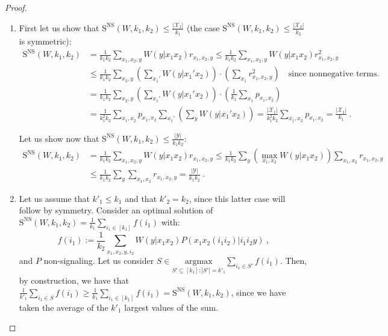 \documentclass[11pt]{article}
\theoremstyle{definition}
\theoremstyle{remark}
\begin{document}
\begin{proof}
\begin{enumerate}
  \item First let us show that $\mathrm{S}^{\mathrm{NS}}(W,k_1,k_2) \leq \frac{|\mathcal{X}_1|}{k_1}$ (the case $\mathrm{S}^{\mathrm{NS}}(W,k_1,k_2) \leq \frac{|\mathcal{X}_2|}{k_2}$ is symmetric):
    \begin{equation}
      \begin{aligned}
        \mathrm{S}^{\mathrm{NS}}(W,k_1,k_2) &= \frac{1}{k_1k_2} \sum_{x_1,x_2,y} W(y|x_1x_2)r_{x_1,x_2,y} \leq \frac{1}{k_1k_2} \sum_{x_1,x_2,y} W(y|x_1x_2)r^2_{x_1,x_2,y}\\
        &\leq \frac{1}{k_1k_2} \sum_{x_2,y} \left(\sum_{x_1'} W(y|x_1'x_2)\right)\cdot\left(\sum_{x_1} r^2_{x_1,x_2,y} \right) \quad \text{since nonnegative terms.}\\
        &=  \frac{1}{k_1k_2} \sum_{x_2,y} \left(\sum_{x_1'} W(y|x_1'x_2)\right)\cdot\left(\frac{1}{k_1} \sum_{x_1} p_{x_1,x_2} \right)\\
        &= \frac{1}{k_1^2k_2} \sum_{x_1,x_2} p_{x_1,x_2} \sum_{x_1'}\left(\sum_y W(y|x_1'x_2)\right) = \frac{|\mathcal{X}_1|}{k_1^2k_2} \sum_{x_1,x_2} p_{x_1,x_2} = \frac{|\mathcal{X}_1|}{k_1} \ .
      \end{aligned}
    \end{equation}

    Let us show now that $\mathrm{S}^{\mathrm{NS}}(W,k_1,k_2) \leq \frac{|\mathcal{Y}|}{k_1k_2}$:
    \begin{equation}
      \begin{aligned}
        \mathrm{S}^{\mathrm{NS}}(W,k_1,k_2) &= \frac{1}{k_1k_2} \sum_{x_1,x_2,y} W(y|x_1x_2)r_{x_1,x_2,y} \leq \frac{1}{k_1k_2} \sum_{y} \left(\max_{x_1,x_2} W(y|x_1x_2)\right) \sum_{x_1,x_2} r_{x_1,x_2,y}\\
        &\leq \frac{1}{k_1k_2} \sum_{y} \sum_{x_1,x_2} r_{x_1,x_2,y} = \frac{|\mathcal{Y}|}{k_1k_2} \ .
      \end{aligned}
    \end{equation}
  \item Let us assume that $k'_1 \leq k_1$ and that $k'_2 = k_2$, since this latter case will follow by symmetry. Consider an optimal solution of $\mathrm{S}^{\mathrm{NS}}(W,k_1,k_2) = \frac{1}{k_1} \sum_{i_1 \in [k_1]} f(i_1)$ with:
    \[ f(i_1) := \frac{1}{k_2} \sum_{x_1,x_2,y,i_2} W(y|x_1x_2)P(x_1x_2(i_1i_2)|i_1i_2y) \ ,\]
    and $P$ non-signaling. Let us consider $S \in \underset{S' \subseteq [k_1]: |S'|=k'_1}{\text{argmax}} \sum_{i_1 \in S'} f(i_1)$. Then, by construction, we have that $\frac{1}{k'_1}\sum_{i_1 \in S} f(i_1) \geq \frac{1}{k_1} \sum_{i_1 \in [k_1]} f(i_1) = \mathrm{S}^{\mathrm{NS}}(W,k_1,k_2)$, since we have taken the average of the $k'_1$ largest values of the sum.


\end{enumerate}
\end{proof}
\end{document}
